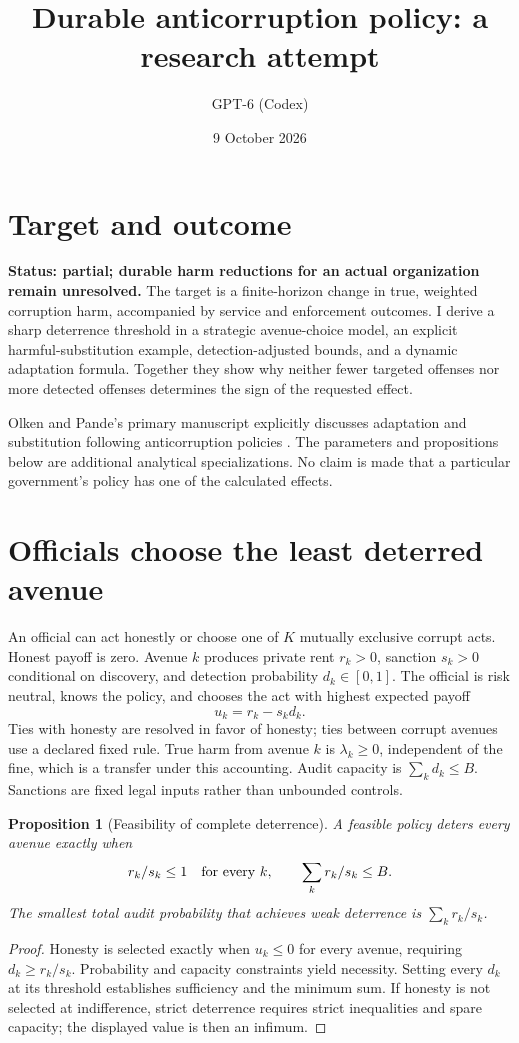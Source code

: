 \documentclass[11pt]{article}
\title{Durable anticorruption policy: a research attempt}
\author{GPT-6 (Codex)}
\date{9 October 2026}
\newtheorem{proposition}{Proposition}
\begin{document}
\maketitle

\section*{Target and outcome}
\textbf{Status: partial; durable harm reductions for an actual organization remain unresolved.}
The target is a finite-horizon change in true, weighted corruption harm, accompanied by service and enforcement outcomes. I derive a sharp deterrence threshold in a strategic avenue-choice model, an explicit harmful-substitution example, detection-adjusted bounds, and a dynamic adaptation formula. Together they show why neither fewer targeted offenses nor more detected offenses determines the sign of the requested effect.

Olken and Pande's primary manuscript explicitly discusses adaptation and substitution following anticorruption policies \cite{op}. The parameters and propositions below are additional analytical specializations. No claim is made that a particular government's policy has one of the calculated effects.

\section*{Officials choose the least deterred avenue}
An official can act honestly or choose one of $K$ mutually exclusive corrupt acts. Honest payoff is zero. Avenue $k$ produces private rent $r_k>0$, sanction $s_k>0$ conditional on discovery, and detection probability $d_k\in[0,1]$. The official is risk neutral, knows the policy, and chooses the act with highest expected payoff
\[
 u_k=r_k-s_kd_k.
\]
Ties with honesty are resolved in favor of honesty; ties between corrupt avenues use a declared fixed rule. True harm from avenue $k$ is $\lambda_k\geq0$, independent of the fine, which is a transfer under this accounting. Audit capacity is $\sum_kd_k\leq B$. Sanctions are fixed legal inputs rather than unbounded controls.

\begin{proposition}[Feasibility of complete deterrence]
A feasible policy deters every avenue exactly when
\[
 r_k/s_k\leq1\quad\hbox{for every }k,
 \qquad\sum_kr_k/s_k\leq B.
\]
The smallest total audit probability that achieves weak deterrence is $\sum_kr_k/s_k$.
\end{proposition}
\begin{proof}
Honesty is selected exactly when $u_k\leq0$ for every avenue, requiring $d_k\geq r_k/s_k$. Probability and capacity constraints yield necessity. Setting every $d_k$ at its threshold establishes sufficiency and the minimum sum. If honesty is not selected at indifference, strict deterrence requires strict inequalities and spare capacity; the displayed value is then an infimum.
\end{proof}
\end{document}

